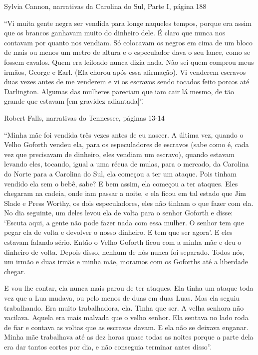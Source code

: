 Sylvia Cannon, narrativas da Carolina do Sul, Parte I, página 188

``Vi muita gente negra ser vendida para longe naqueles tempos, porque
era assim que os brancos ganhavam muito do dinheiro dele. É claro que
nunca nos contavam por quanto nos vendiam. Só colocavam os negros em
cima de um bloco de mais ou menos um metro de altura e o especulador
dava o seu lance, como se fossem cavalos. Quem era leiloado nunca dizia
nada. Não sei quem comprou meus irmãos, George e Earl. (Ela chorou após
essa afirmação). Vi venderem escravos duas vezes antes de me venderem e
vi os escravos sendo tocados feito porcos até Darlington. Algumas das
mulheres pareciam que iam cair lá mesmo, de tão grande que estavam {[}em
gravidez adiantada{]}''.

Robert Falls, narrativas do Tennessee, páginas 13-14

``Minha mãe foi vendida três vezes antes de eu nascer. A última vez,
quando o Velho Goforth vendeu ela, para os especuladores de escravos
(sabe como é, cada vez que precisavam de dinheiro, eles vendiam um
escravo), quando estavam levando eles, tocando, igual a uma récua de
mulas, para o mercado, da Carolina do Norte para a Carolina do Sul, ela
começou a ter um ataque. Pois tinham vendido ela sem o bebê, sabe? E bem
assim, ela começou a ter ataques. Eles chegaram na cadeia, onde iam
passar a noite, e ela ficou em tal estado que Jim Slade e Press Worthy,
os dois especuladores, eles não tinham o que fazer com ela. No dia
seguinte, um deles levou ela de volta para o senhor Goforth e disse:
`Escuta aqui, a gente não pode fazer nada com essa mulher. O senhor tem
que pegar ela de volta e devolver o nosso dinheiro. E tem que ser
agora'. E eles estavam falando sério. Então o Velho Goforth ficou com a
minha mãe e deu o dinheiro de volta. Depois disso, nenhum de nós nunca
foi separado. Todos nós, um irmão e duas irmãs e minha mãe, moramos com
os Goforths até a liberdade chegar.

E vou lhe contar, ela nunca mais parou de ter ataques. Ela tinha um
ataque toda vez que a Lua mudava, ou pelo menos de duas em duas Luas.
Mas ela seguiu trabalhando. Era muito trabalhadora, ela. Tinha que ser.
A velha senhora não vacilava. Aquela era mais malvada que o velho
senhor. Ela sentava no lado roda de fiar e contava as voltas que as
escravas davam. E ela não se deixava enganar. Minha mãe trabalhava até
as dez horas quase todas as noites porque a parte dela era dar tantos
cortes por dia, e não conseguia terminar antes disso''.

